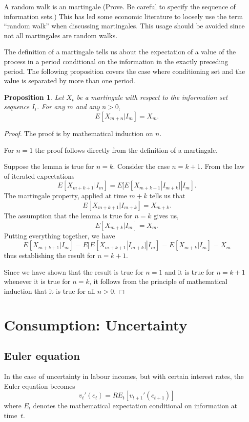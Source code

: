 \documentclass[11pt,reqno,openany]{amsbook}
\theoremstyle{plain}
\newtheorem{prop}{Proposition}[chapter]
\theoremstyle{definition}
\begin{document}
A random walk is an martingale (Prove. Be careful to specify the
sequence of information sets.) This has led some economic literature
to loosely use the term ``random walk'' when discussing martingales.
This usage should be avoided since not all martingales are random walks.

The definition of a martingale tells us about the expectation of a
value of the process in a period conditional on the information in the
exactly preceding period. The following proposition covers the case where
conditioning set and the value is separated by more than one period.

\begin{prop}\label{prop:martingale-mp}
Let $X_t$ be a martingale with respect to the information set sequence
$I_t$. For any $m$ and any $n>0$,
\[E[X_{m+n}|I_m]=X_m.\]
\end{prop}
\begin{proof}
The proof is by mathematical induction on $n$.

For $n=1$ the proof follows directly from the definition of a martingale.

Suppose the lemma is true for $n=k$. Consider the case $n=k+1$.
From the law of
iterated expectations
\[E[X_{m+k+1}|I_m]=E[E[X_{m+k+1}|I_{m+k}]|I_m].\]
The martingale property, applied at time $m+k$ tells us that
\[E[X_{m+k+1}|I_{m+k}]=X_{m+k}.\] 
The assumption that the lemma is true for $n=k$ gives us,
\[E[X_{m+k}|I_m]=X_m.\]
Putting everything together, we have
\[E[X_{m+k+1}|I_m]=E[E[X_{m+k+1}|I_{m+k}]|I_m]=E[X_{m+k}|I_m]=X_m\]
thus establishing the result for $n=k+1$.

Since we have shown that the result is true for $n=1$ and it is true
for $n=k+1$ whenever it is true for $n=k$, it follows from the
principle of mathematical induction that it is true for all $n>0$.
\end{proof}






\chapter{Consumption: Uncertainty}
\section{Euler equation}
In the case of uncertainty in labour incomes, but with certain
interest rates, the Euler equation becomes
\begin{equation}\label{eq:euler-uncertain}
v_t'(c_t)=RE_t[v_{t+1}'(c_{t+1})]
\end{equation}
where $E_t$ denotes the mathematical expectation conditional on information at time~$t$.
\end{document}

